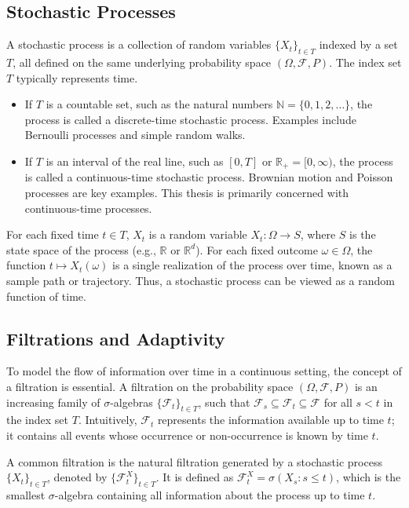 \documentclass[11pt,twoside,openright]{report}
\begin{document}
\subsection{Stochastic Processes}
\label{subsec:stoch_proc}

A stochastic process is a collection of random variables $\{X_t\}_{t \in T}$ indexed by a set $T$, all defined on the same underlying probability space $(\Omega, \mathcal{F}, P)$. The index set $T$ typically represents time.
\begin{itemize}
    \item If $T$ is a countable set, such as the natural numbers $\mathbb{N} = \{0, 1, 2, \dots\}$, the process is called a discrete-time stochastic process. Examples include Bernoulli processes and simple random walks.
    \item If $T$ is an interval of the real line, such as $[0, T]$ or $\mathbb{R}_+ = [0, \infty)$, the process is called a continuous-time stochastic process. Brownian motion and Poisson processes are key examples. This thesis is primarily concerned with continuous-time processes.
\end{itemize}
For each fixed time $t \in T$, $X_t$ is a random variable $X_t: \Omega \to S$, where $S$ is the state space of the process (e.g., $\mathbb{R}$ or $\mathbb{R}^d$). For each fixed outcome $\omega \in \Omega$, the function $t \mapsto X_t(\omega)$ is a single realization of the process over time, known as a sample path or trajectory. Thus, a stochastic process can be viewed as a random function of time.

\subsection{Filtrations and Adaptivity}
\label{subsec:filtrations}

To model the flow of information over time in a continuous setting, the concept of a filtration is essential. A filtration on the probability space $(\Omega, \mathcal{F}, P)$ is an increasing family of $\sigma$-algebras $\{\mathcal{F}_t\}_{t \in T}$, such that $\mathcal{F}_s \subseteq \mathcal{F}_t \subseteq \mathcal{F}$ for all $s < t$ in the index set $T$. Intuitively, $\mathcal{F}_t$ represents the information available up to time $t$; it contains all events whose occurrence or non-occurrence is known by time $t$.

A common filtration is the natural filtration generated by a stochastic process $\{X_t\}_{t \in T}$, denoted by $\{\mathcal{F}_t^X\}_{t \in T}$. It is defined as $\mathcal{F}_t^X = \sigma(X_s : s \le t)$, which is the smallest $\sigma$-algebra containing all information about the process up to time $t$.
\end{document}
